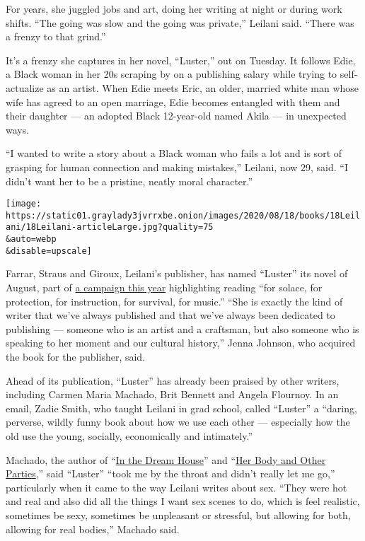 For years, she juggled jobs and art, doing her writing at night or
during work shifts. ``The going was slow and the going was private,''
Leilani said. ``There was a frenzy to that grind.''

It's a frenzy she captures in her novel, ``Luster,'' out on Tuesday. It
follows Edie, a Black woman in her 20s scraping by on a publishing
salary while trying to self-actualize as an artist. When Edie meets
Eric, an older, married white man whose wife has agreed to an open
marriage, Edie becomes entangled with them and their daughter --- an
adopted Black 12-year-old named Akila --- in unexpected ways.

``I wanted to write a story about a Black woman who fails a lot and is
sort of grasping for human connection and making mistakes,'' Leilani,
now 29, said. ``I didn't want her to be a pristine, neatly moral
character.''

\texttt{[image: https://static01.graylady3jvrrxbe.onion/images/2020/08/18/books/18Leilani/18Leilani-articleLarge.jpg?quality=75\\\&auto=webp\\\&disable=upscale]}

Farrar, Straus and Giroux, Leilani's publisher, has named ``Luster'' its
novel of August, part of \href{https://fsg2020.com/}{a campaign this
year} highlighting reading ``for solace, for protection, for
instruction, for survival, for music.'' ``She is exactly the kind of
writer that we've always published and that we've always been dedicated
to publishing --- someone who is an artist and a craftsman, but also
someone who is speaking to her moment and our cultural history,'' Jenna
Johnson, who acquired the book for the publisher, said.

Ahead of its publication, ``Luster'' has already been praised by other
writers, including Carmen Maria Machado, Brit Bennett and Angela
Flournoy. In an email, Zadie Smith, who taught Leilani in grad school,
called ``Luster'' a ``daring, perverse, wildly funny book about how we
use each other --- especially how the old use the young, socially,
economically and intimately.''

Machado, the author of
``\href{https://www.nytimes3xbfgragh.onion/2019/10/29/books/in-dream-house-memoir-carmen-maria-machado.html}{In
the Dream House}'' and
``\href{https://www.nytimes3xbfgragh.onion/2017/10/04/books/review-her-body-and-other-parties-carmen-maria-machado.html}{Her
Body and Other Parties},'' said ``Luster'' ``took me by the throat and
didn't really let me go,'' particularly when it came to the way Leilani
writes about sex. ``They were hot and real and also did all the things I
want sex scenes to do, which is feel realistic, sometimes be sexy,
sometimes be unpleasant or stressful, but allowing for both, allowing
for real bodies,'' Machado said.

